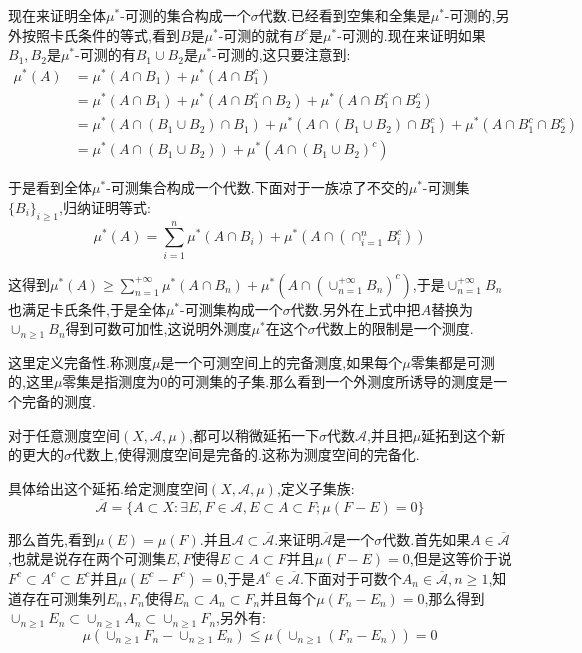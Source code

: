 现在来证明全体$\mu^*$-可测的集合构成一个$\sigma$代数.已经看到空集和全集是$\mu^*$-可测的,另外按照卡氏条件的等式,看到$B$是$\mu^*$-可测的就有$B^c$是$\mu^*$-可测的.现在来证明如果$B_1,B_2$是$\mu^*$-可测的有$B_1\cup B_2$是$\mu^*$-可测的,这只要注意到:
\begin{align*}
\mu^*(A)&=\mu^*(A\cap B_1)+\mu^*(A\cap B_1^c)\\
&=\mu^*(A\cap B_1)+\mu^*(A\cap B_1^c\cap B_2)+\mu^*(A\cap B_1^c\cap B_2^c) \\
&=\mu^*(A\cap(B_1\cup B_2)\cap B_1)+\mu^*(A\cap(B_1\cup B_2)\cap B_1^c)+\mu^*(A\cap B_1^c\cap B_2^c) \\
&=\mu^*(A\cap(B_1\cup B_2))+\mu^*(A\cap(B_1\cup B_2)^c)
\end{align*}

于是看到全体$\mu^*$-可测集合构成一个代数.下面对于一族凉了不交的$\mu^*$-可测集$\{B_i\}_{i\ge1}$,归纳证明等式:
$$\mu^*(A)=\sum_{i=1}^{n}\mu^*(A\cap B_i)+\mu^*(A\cap\left(\cap_{i=1}^nB_i^c\right))$$

这得到$\mu^*(A)\ge\sum_{n=1}^{+\infty}\mu^*(A\cap B_n)+\mu^*(A\cap\left(\cup_{n=1}^{+\infty}B_n\right)^c)$,于是$\cup_ {n=1}^{+\infty}B_n$也满足卡氏条件,于是全体$\mu^*$-可测集构成一个$\sigma$代数.另外在上式中把$A$替换为$\cup_{n\ge1}B_n$得到可数可加性,这说明外测度$\mu^*$在这个$\sigma$代数上的限制是一个测度.

这里定义完备性.称测度$\mu$是一个可测空间上的完备测度,如果每个$\mu$零集都是可测的,这里$\mu$零集是指测度为0的可测集的子集.那么看到一个外测度所诱导的测度是一个完备的测度.

对于任意测度空间$(X,\mathscr{A},\mu)$,都可以稍微延拓一下$\sigma$代数$\mathscr{A}$,并且把$\mu$延拓到这个新的更大的$\sigma$代数上,使得测度空间是完备的.这称为测度空间的完备化.

具体给出这个延拓.给定测度空间$(X,\mathscr{A},\mu)$,定义子集族:
$$\overline{\mathscr{A}}=\{A\subset X:\exists E,F\in\mathscr{A},E\subset A\subset F;\mu(F-E)=0\}$$

那么首先,看到$\mu(E)=\mu(F)$.并且$\mathscr{A}\subset\overline{\mathscr{A}}$.来证明$\overline{\mathscr{A}}$是一个$\sigma$代数.首先如果$A\in\overline{\mathscr{A}}$,也就是说存在两个可测集$E,F$使得$E\subset A\subset F$并且$\mu(F-E)=0$,但是这等价于说$F^c\subset A^c\subset E^c$并且$\mu(E^c-F^c)=0$,于是$A^c\in\overline{\mathscr{A}}$.下面对于可数个$A_n\in\overline{\mathscr{A}},n\ge1$,知道存在可测集列$E_n,F_n$使得$E_n\subset A_n\subset F_n$并且每个$\mu(F_n-E_n)=0$,那么得到$\cup_ {n\ge1}E_n\subset\cup_{n\ge1}A_n\subset\cup_{n\ge1}F_n$,另外有:
$$\mu\left(\cup_{n\ge1}F_n-\cup_{n\ge1}E_n\right)\le\mu\left(\cup_{n\ge1}(F_n-E_n)\right)=0$$

